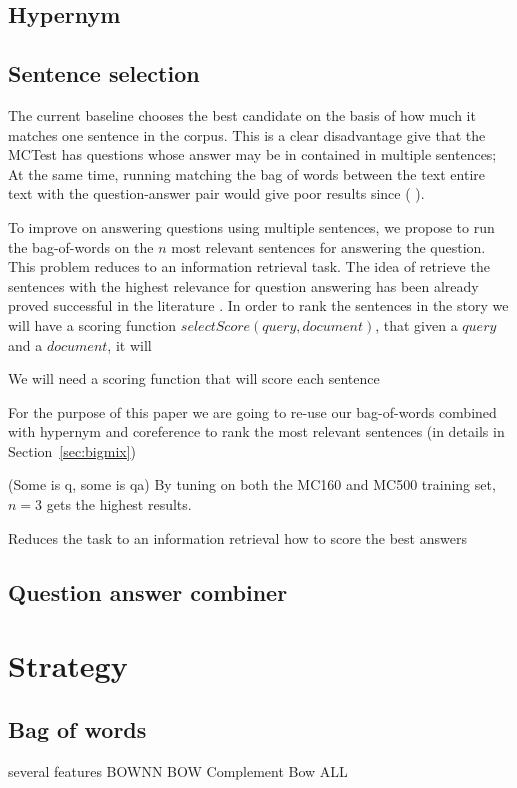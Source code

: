 \documentclass[11pt]{article}
\begin{document}
\subsection{Hypernym}
\subsection{Sentence selection}
The current baseline chooses the best candidate on the basis of how much it matches one sentence in the corpus. This is a clear disadvantage give that the MCTest has questions whose answer may be in contained in multiple sentences; At the same time, running matching the bag of words between the text entire text with the question-answer pair would give poor results  since (%
).

To improve on answering questions using multiple sentences, we propose to run the bag-of-words on the $n$ most relevant sentences for answering the question. This problem reduces to an information retrieval task. The idea of retrieve the sentences with the highest relevance for question answering has been already proved successful in the literature \cite{qa_techniques, deep_selection}. In order to rank the sentences in the story we will have a scoring function $selectScore(query, document)$, that given a $query$ and a $document$, it will %

We will need a scoring function that will score each sentence

 For the purpose of this paper we are going to re-use our bag-of-words combined with hypernym and coreference to rank the most relevant sentences (in details in Section~\ref{sec:bigmix})



 (Some is q, some is qa)  By tuning on both the {\small MC160} and {\small MC500} training set, $n=3$ gets the highest results.

Reduces the task to an information retrieval
how to score the best answers

\subsection{Question answer combiner}

\section{Strategy}
\subsection{Bag of words}
\label{sec:bagofwords}
several features
BOWNN
BOW Complement
Bow ALL
\end{document}
